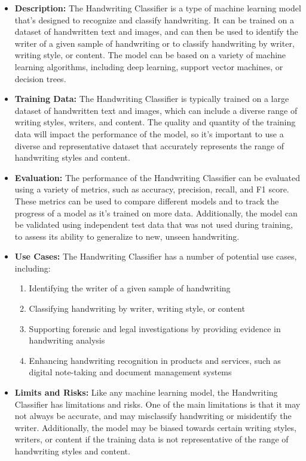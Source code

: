 \begin{itemize}
\begin{itemize}
    \item \textbf{Description:} The Handwriting Classifier is a type of machine learning model that's designed to recognize and classify handwriting. It can be trained on a dataset of handwritten text and images, and can then be used to identify the writer of a given sample of handwriting or to classify handwriting by writer, writing style, or content. The model can be based on a variety of machine learning algorithms, including deep learning, support vector machines, or decision trees.
    \item \textbf{Training Data:} The Handwriting Classifier is typically trained on a large dataset of handwritten text and images, which can include a diverse range of writing styles, writers, and content. The quality and quantity of the training data will impact the performance of the model, so it's important to use a diverse and representative dataset that accurately represents the range of handwriting styles and content.
    \item \textbf{Evaluation:} The performance of the Handwriting Classifier can be evaluated using a variety of metrics, such as accuracy, precision, recall, and F1 score. These metrics can be used to compare different models and to track the progress of a model as it's trained on more data. Additionally, the model can be validated using independent test data that was not used during training, to assess its ability to generalize to new, unseen handwriting.
    \item \textbf{Use Cases:} The Handwriting Classifier has a number of potential use cases, including:
        \begin{enumerate}  
            \item Identifying the writer of a given sample of handwriting
            \item Classifying handwriting by writer, writing style, or content
            \item Supporting forensic and legal investigations by providing evidence in handwriting analysis
            \item Enhancing handwriting recognition in products and services, such as digital note-taking and document management systems
        \end{enumerate}
    \item \textbf{Limits and Risks:} Like any machine learning model, the Handwriting Classifier has limitations and risks. One of the main limitations is that it may not always be accurate, and may misclassify handwriting or misidentify the writer. Additionally, the model may be biased towards certain writing styles, writers, or content if the training data is not representative of the range of handwriting styles and content.

\end{itemize}
\end{itemize}
